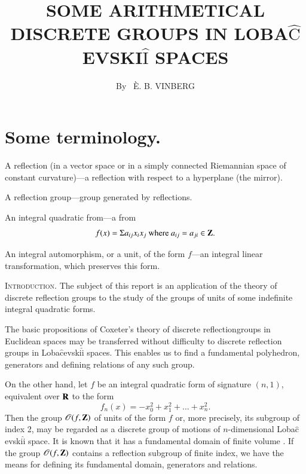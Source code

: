 
\title{SOME ARITHMETICAL DISCRETE GROUPS IN LOBA$\hat{\text{C}}$EVSKI$\hat{\text{I}}$ SPACES}

\author{By~ \`E. B. VINBERG}

\date{}
\maketitle


\setcounter{page}{344}
\setcounter{pageoriginal}{322}
\section*{Some terminology.}\pageoriginale 

A reflection (in a vector space or in a simply connected Riemannian space of constant curvature)---a reflection with respect to a hyperplane (the mirror).

A reflection group---group generated by reflections. 

An integral quadratic from---a from 
$$
f(x) = \Sigma a_{ij} x_i x_j \text{ where } a_{ij} = a_{ji} \in \mathbf{Z}.
$$

An integral automorphism, or a unit, of the form $f$---an integral linear transformation, which preserves this form.

\textsc{Introduction.} The subject of this report is an application of the theory of discrete reflection groups to the study of the groups of units of some indefinite integral quadratic forms.

The basic propositions of Coxeter's theory of discrete reflection\break groups in Euclidean spaces \cite{art10-key1} may be transferred without difficulty to discrete reflection groups in Loba$\hat{\text{c}}$evski$\hat{\text{i}}$ spaces. This enables us to find a fundamental polyhedron, generators and defining relations of any such group.

On the other hand, let $f$ be an integral quadratic form of signature $(n,1)$, \ie equivalent over $\mathbf{R}$ to the form 
$$
f_n (x) = - x^2_0 + x^2_1 + \ldots + x^2_n.
$$
Then the group $\mathscr{O}(f, \mathbf{Z})$ of units of the form $f$ or, more precisely, its subgroup of index 2, may be regarded as a discrete group of motions of $n$-dimensional
Loba$\hat{\text{c}}$evski$\hat{\text{i}}$ space. It is known that it has a fundamental domain of finite volume \cite{art10-key2}. If the group $\mathscr{O}(f, \mathbf{Z})$ contains a reflection subgroup of finite index, we have the means for defining its fundamental domain, generators and relations.

